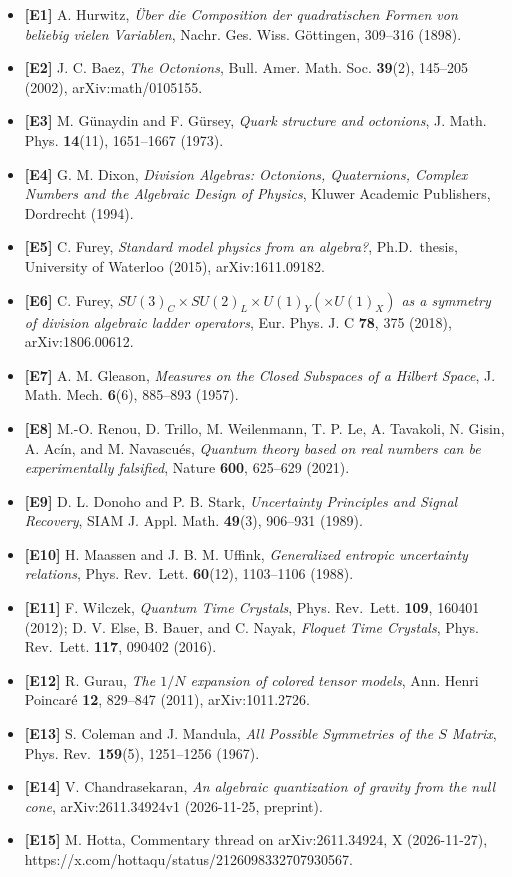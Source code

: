 \documentclass[
  a4paper,
]{article}
\providecommand{\tightlist}{%
  \setlength{\itemsep}{0pt}\setlength{\parskip}{0pt}}
\begin{document}
\begin{itemize}
\tightlist
\item
  \textbf{{[}E1{]}} A. Hurwitz, \emph{Über die Composition der
  quadratischen Formen von beliebig vielen Variablen}, Nachr. Ges. Wiss.
  Göttingen, 309--316 (1898).
\item
  \textbf{{[}E2{]}} J. C. Baez, \emph{The Octonions}, Bull. Amer. Math.
  Soc. \textbf{39}(2), 145--205 (2002), arXiv:math/0105155.
\item
  \textbf{{[}E3{]}} M. Günaydin and F. Gürsey, \emph{Quark structure and
  octonions}, J. Math. Phys. \textbf{14}(11), 1651--1667 (1973).
\item
  \textbf{{[}E4{]}} G. M. Dixon, \emph{Division Algebras: Octonions,
  Quaternions, Complex Numbers and the Algebraic Design of Physics},
  Kluwer Academic Publishers, Dordrecht (1994).
\item
  \textbf{{[}E5{]}} C. Furey, \emph{Standard model physics from an
  algebra?}, Ph.D.~thesis, University of Waterloo (2015),
  arXiv:1611.09182.
\item
  \textbf{{[}E6{]}} C. Furey,
  \emph{\(SU(3)_C \times SU(2)_L \times U(1)_Y (\times U(1)_X)\) as a
  symmetry of division algebraic ladder operators}, Eur. Phys. J. C
  \textbf{78}, 375 (2018), arXiv:1806.00612.
\item
  \textbf{{[}E7{]}} A. M. Gleason, \emph{Measures on the Closed
  Subspaces of a Hilbert Space}, J. Math. Mech. \textbf{6}(6), 885--893
  (1957).
\item
  \textbf{{[}E8{]}} M.-O. Renou, D. Trillo, M. Weilenmann, T. P. Le, A.
  Tavakoli, N. Gisin, A. Acín, and M. Navascués, \emph{Quantum theory
  based on real numbers can be experimentally falsified}, Nature
  \textbf{600}, 625--629 (2021).
\item
  \textbf{{[}E9{]}} D. L. Donoho and P. B. Stark, \emph{Uncertainty
  Principles and Signal Recovery}, SIAM J. Appl. Math. \textbf{49}(3),
  906--931 (1989).
\item
  \textbf{{[}E10{]}} H. Maassen and J. B. M. Uffink, \emph{Generalized
  entropic uncertainty relations}, Phys. Rev.~Lett. \textbf{60}(12),
  1103--1106 (1988).
\item
  \textbf{{[}E11{]}} F. Wilczek, \emph{Quantum Time Crystals}, Phys.
  Rev.~Lett. \textbf{109}, 160401 (2012); D. V. Else, B. Bauer, and C.
  Nayak, \emph{Floquet Time Crystals}, Phys. Rev.~Lett. \textbf{117},
  090402 (2016).
\item
  \textbf{{[}E12{]}} R. Gurau, \emph{The \(1/N\) expansion of colored
  tensor models}, Ann. Henri Poincaré \textbf{12}, 829--847 (2011),
  arXiv:1011.2726.
\item
  \textbf{{[}E13{]}} S. Coleman and J. Mandula, \emph{All Possible
  Symmetries of the \(S\) Matrix}, Phys. Rev.~\textbf{159}(5),
  1251--1256 (1967).
\item
  \textbf{{[}E14{]}} V. Chandrasekaran, \emph{An algebraic quantization
  of gravity from the null cone}, arXiv:2611.34924v1 (2026-11-25,
  preprint).
\item
  \textbf{{[}E15{]}} M. Hotta, Commentary thread on arXiv:2611.34924, X
  (2026-11-27), https://x.com/hottaqu/status/2126098332707930567.
\end{itemize}
\end{document}
